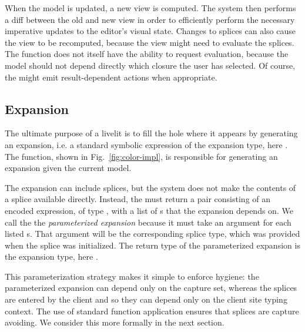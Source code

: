 When the model is updated, a new view is 
computed. The system then performs a diff between the old and new view in order to 
efficiently perform the necessary imperative updates to the editor's visual state.
Changes to splices can also cause the view to be recomputed, because the view might 
need to evaluate the splices. The  function does not itself 
have the ability to request evaluation, because the model should not depend directly  
which closure the user has selected. Of course, the  might emit 
result-dependent actions when appropriate.

\subsection{Expansion}
\label{sec:expansion}
The ultimate purpose of a livelit is to fill the hole where it appears by generating an expansion,
i.e. a standard symbolic expression of the expansion type, here .
The  function, shown in Fig.~\ref{fig:color-impl}, is responsible for generating 
an expansion given the current model.

The expansion can include splices, but the system does not make the contents of a splice 
available directly. Instead, the  must return a pair consisting of an encoded expression, of type 
, with a list of s that the expansion depends on. 
We call the  the \emph{parameterized expansion}
 because it must take an argument for each listed s. 
 That argument will be the corresponding splice 
type, which was provided when the splice was initialized. 
 The return type of the parameterized expansion is the expansion type, here .

This parameterization strategy makes it simple to enforce hygiene: the parameterized expansion 
can depend only on the capture set, whereas the splices are entered by the client and so they can 
depend only on the client site typing context. The use of standard function application ensures
that splices are capture avoiding. We consider this more formally in the next section.
